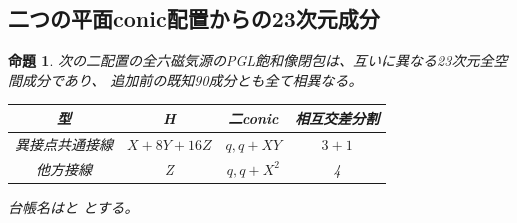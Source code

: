 \documentclass[a4paper,11pt]{ltjsarticle}
\newtheorem{proposition}{命題}[section]
\theoremstyle{definition}
\begin{document}
\subsection{二つの平面conic配置からの23次元成分}
\begin{proposition}\label{prop:plane-two-conics-two-components}
次の二配置の全六磁気源のPGL飽和像閉包は、互いに異なる23次元全空間成分であり、
追加前の既知90成分とも全て相異なる。
\begin{center}\small
\begin{tabular}{c|c|c|c}
型&H&二conic&相互交差分割\\\hline
異接点共通接線&$X+8Y+16Z$&$q,q+XY$&$3+1$\\
他方接線&Z&$q,q+X^2$&4
\end{tabular}
\end{center}
台帳名はと
とする。
\end{proposition}
\end{document}
